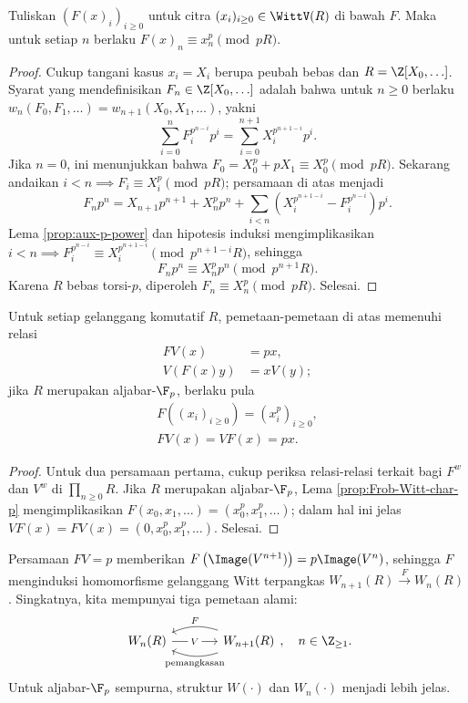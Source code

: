 \begin{lemma}\label{prop:Frob-Witt-char-p}
	Tuliskan $(F(x)_i)_{i \geq 0}$ untuk citra $(x_i)_{i \geq 0} \in \WittV(R)$ di bawah $F$. Maka untuk setiap $n$ berlaku $F(x)_n \equiv x_n^p \pmod{pR}$.
\end{lemma}
\begin{proof}
	Cukup tangani kasus $x_i = X_i$ berupa peubah bebas dan $R=\Z[X_0, \ldots]$. Syarat yang mendefinisikan $F_n \in \Z[X_0, \ldots]$ adalah bahwa untuk $n \geq 0$ berlaku $w_n(F_0, F_1, \ldots) = w_{n+1}(X_0, X_1, \ldots)$, yakni
	\[ \sum_{i=0}^n F_i^{p^{n-i}} p^i = \sum_{i=0}^{n+1} X_i^{p^{n+1-i}} p^i. \]
	Jika $n=0$, ini menunjukkan bahwa $F_0 = X_0^p + pX_1 \equiv X_0^p \pmod {pR}$. Sekarang andaikan $i < n \implies F_i \equiv X_i^p \pmod{pR}$; persamaan di atas menjadi
	\[ F_n p^n = X_{n+1} p^{n+1} + X_n^p p^n + \sum_{i<n} \left( X_i^{p^{n+1-i}} - F_i^{p^{n-i}} \right) p^i. \]
	Lema \ref{prop:aux-p-power} dan hipotesis induksi mengimplikasikan $i < n \implies F_i^{p^{n-i}} \equiv X_i^{p^{n+1-i}} \pmod{p^{n+1-i} R}$, sehingga
	\[ F_n p^n \equiv X_n^p p^n \pmod{p^{n+1} R}. \]
	Karena $R$ bebas torsi-$p$, diperoleh $F_n \equiv X_n^p \pmod{pR}$. Selesai.
\end{proof}

\begin{proposition}\label{prop:FV-VF}
	Untuk setiap gelanggang komutatif $R$, pemetaan-pemetaan di atas memenuhi relasi
	\begin{align*}
		F V(x) & = px, \\
		V (F(x) y) & = x V(y);
	\end{align*}
	jika $R$ merupakan aljabar-$\F_p$, berlaku pula
	\begin{gather*}
		F\left((x_i)_{i \geq 0} \right) = (x_i^p)_{i \geq 0}, \\
		F V (x) = V F (x) = px.
	\end{gather*}
\end{proposition}
\begin{proof}
	Untuk dua persamaan pertama, cukup periksa relasi-relasi terkait bagi $F^w$ dan $V^w$ di $\prod_{n \geq 0} R$. Jika $R$ merupakan aljabar-$\F_p$, Lema \ref{prop:Frob-Witt-char-p} mengimplikasikan $F(x_0, x_1, \ldots) = (x_0^p, x_1^p, \ldots)$; dalam hal ini jelas $VF(x) = FV(x) = (0, x_0^p, x_1^p, \ldots)$. Selesai.
\end{proof}

Persamaan $FV = p$ memberikan $F\left(\Image(V^{n+1})\right) = p \Image(V^n)$, sehingga $F$ menginduksi homomorfisme gelanggang Witt terpangkas $W_{n+1}(R) \xrightarrow{F} W_n(R)$. Singkatnya, kita mempunyai tiga pemetaan alami:
\[\begin{tikzcd}[column sep=large]
	W_n(R) \arrow[r, "V" description] & W_{n+1}(R) \arrow[l, bend right=20, "F"'] \arrow[l, bend left=20, "\text{pemangkasan}"]
\end{tikzcd}, \quad n \in \Z_{\geq 1}. \]
Untuk aljabar-$\F_p$ sempurna, struktur $W(\cdot)$ dan $W_n(\cdot)$ menjadi lebih jelas.

